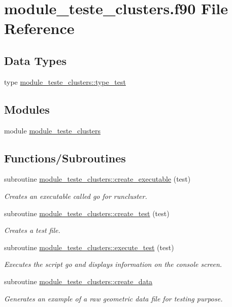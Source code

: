 \hypertarget{module__teste__clusters_8f90}{}\section{module\+\_\+teste\+\_\+clusters.\+f90 File Reference}
\label{module__teste__clusters_8f90}
\subsection*{Data Types}
\begin{DoxyCompactItemize}
\item 
type \hyperlink{structmodule__teste__clusters_1_1type__test}{module\+\_\+teste\+\_\+clusters\+::type\+\_\+test}
\end{DoxyCompactItemize}
\subsection*{Modules}
\begin{DoxyCompactItemize}
\item 
module \hyperlink{namespacemodule__teste__clusters}{module\+\_\+teste\+\_\+clusters}
\end{DoxyCompactItemize}
\subsection*{Functions/\+Subroutines}
\begin{DoxyCompactItemize}
\item 
subroutine \hyperlink{namespacemodule__teste__clusters_aea89e91184c2a89eec2fd785671663f9}{module\+\_\+teste\+\_\+clusters\+::create\+\_\+executable} (test)
\begin{DoxyCompactList}\small\item\em Creates an executable called {\itshape go} for runcluster. \end{DoxyCompactList}\item 
subroutine \hyperlink{namespacemodule__teste__clusters_aaf3c23842ff04fc92eebd8688fe74d70}{module\+\_\+teste\+\_\+clusters\+::create\+\_\+test} (test)
\begin{DoxyCompactList}\small\item\em Creates a test file. \end{DoxyCompactList}\item 
subroutine \hyperlink{namespacemodule__teste__clusters_a9ab3f7278117b04c1ba94ff7cd96e3d2}{module\+\_\+teste\+\_\+clusters\+::execute\+\_\+test} (test)
\begin{DoxyCompactList}\small\item\em Executes the script {\itshape go} and displays information on the console screen. \end{DoxyCompactList}\item 
subroutine \hyperlink{namespacemodule__teste__clusters_aa745f9e68594bf01494b5de549240cf8}{module\+\_\+teste\+\_\+clusters\+::create\+\_\+data}
\begin{DoxyCompactList}\small\item\em Generates an example of a raw geometric data file for testing purpose. \end{DoxyCompactList}\end{DoxyCompactItemize}
